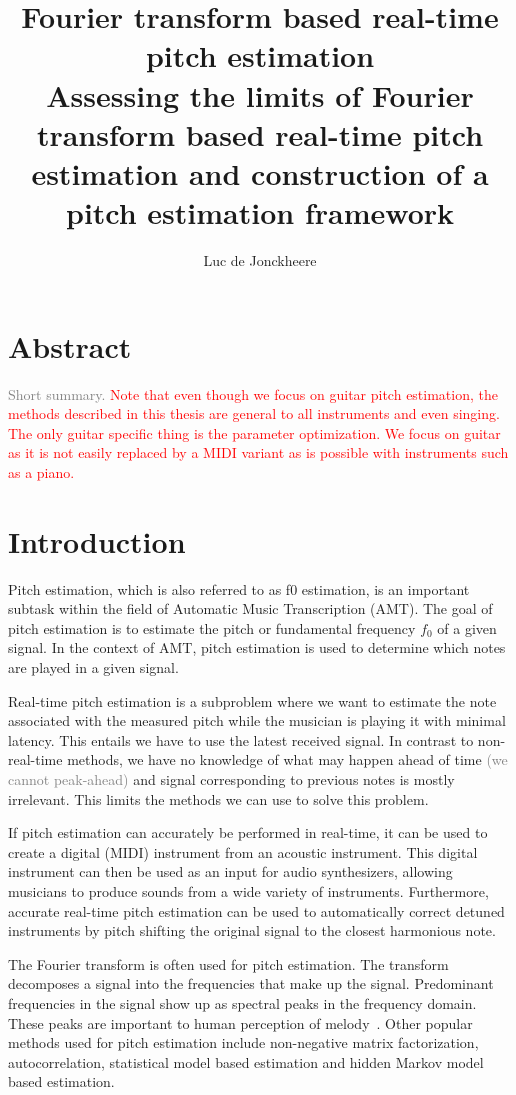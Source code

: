 \documentclass[a4paper,10pt,twocolumn]{article}
\title{\textbf{Fourier transform based real-time pitch estimation}\\Assessing the limits of Fourier transform based real-time pitch estimation and construction of a pitch estimation framework}
\author{Luc de Jonckheere}
\begin{document}

\ifdefined\notitle
\else
    \maketitle
\fi


\section*{Abstract}
\textcolor{gray}{Short summary.}
\textcolor{red}{Note that even though we focus on guitar pitch estimation, the methods described in this thesis are general to all instruments and even singing. The only guitar specific thing is the parameter optimization. We focus on guitar as it is not easily replaced by a MIDI variant as is possible with instruments such as a piano.}


\tableofcontents


\section{Introduction}
Pitch estimation, which is also referred to as f0 estimation, is an important subtask within the field of Automatic Music Transcription (AMT). The goal of pitch estimation is to estimate the pitch or fundamental frequency $f_0$ of a given signal. In the context of AMT, pitch estimation is used to determine which notes are played in a given signal.

Real-time pitch estimation is a subproblem where we want to estimate the note associated with the measured pitch while the musician is playing it with minimal latency. This entails we have to use the latest received signal. In contrast to non-real-time methods, we have no knowledge of what may happen ahead of time \textcolor{gray}{(we cannot peak-ahead)} and signal corresponding to previous notes is mostly irrelevant. This limits the methods we can use to solve this problem.

If pitch estimation can accurately be performed in real-time, it can be used to create a digital (MIDI) instrument from an acoustic instrument. This digital instrument can then be used as an input for audio synthesizers, allowing musicians to produce sounds from a wide variety of instruments. Furthermore, accurate real-time pitch estimation can be used to automatically correct detuned instruments by pitch shifting the original signal to the closest harmonious note.

The Fourier transform is often used for pitch estimation. The transform decomposes a signal into the frequencies that make up the signal. Predominant frequencies in the signal show up as spectral peaks in the frequency domain. These peaks are important to human perception of melody~\cite{hearing}. %
Other popular methods used for pitch estimation include non-negative matrix factorization, autocorrelation, statistical model based estimation and hidden Markov model based estimation.
\end{document}
